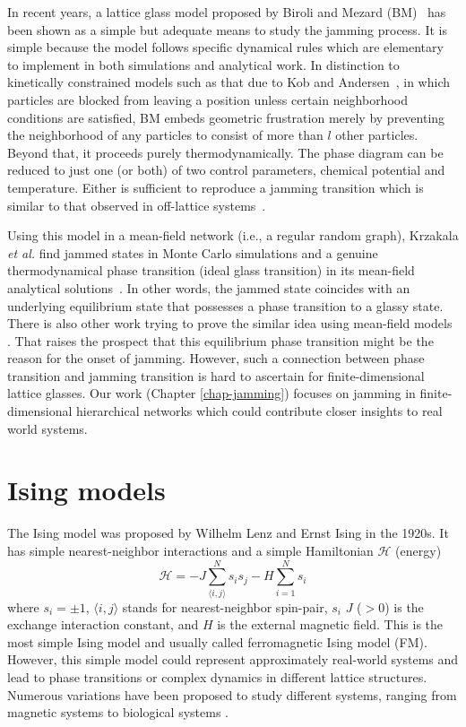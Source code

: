 In recent years, a lattice glass model proposed by Biroli and Mezard
(BM)~\cite{Biroli02} has been shown as a simple but adequate means
to study the jamming process. It is simple because the model follows
specific dynamical rules which are elementary to implement in both
simulations and analytical work. In distinction to kinetically constrained
models such as that due to Kob and Andersen~\cite{Kob93}, in which
particles are blocked from leaving a position unless certain neighborhood
conditions are satisfied, BM embeds geometric frustration merely by
preventing the neighborhood of any particles to consist of more than
$l$ other particles. Beyond that, it proceeds purely thermodynamically.
The phase diagram can be reduced to just one (or both) of two control
parameters, chemical potential and temperature. Either is sufficient
to reproduce a jamming transition which is similar to that observed
in off-lattice systems~\cite{Biroli02}. 

Using this model in a mean-field network 
(i.e., a regular random graph), Krzakala \textit{et al.} find
jammed states in Monte Carlo simulations and a genuine thermodynamical
phase transition (ideal glass transition) in its mean-field analytical
solutions~\cite{Krzakala2008}. In other words, the jammed state coincides
with an underlying equilibrium state that possesses a phase transition
to a glassy state. There is also other work trying to prove the similar idea using mean-field models \cite{Rivoire03,berthier2011theory, Parisi2010}. That raises the prospect that this equilibrium phase transition might be the reason for the onset of jamming. However, such a connection between phase transition and jamming transition is hard to ascertain for finite-dimensional lattice glasses. Our work (Chapter \ref{chap-jamming}) focuses on jamming in finite-dimensional hierarchical networks which could contribute closer insights to real world systems.



\section{Ising models}
The Ising model was proposed by Wilhelm Lenz and Ernst Ising \cite{ising1925contribution, brush1967history} in the 1920s. It has simple nearest-neighbor interactions and a simple Hamiltonian $\mathcal{H}$ (energy)
\begin{equation}
\mathcal{H}=-J \sum_{\langle i, j\rangle}^N s_i s_j - H \sum_{i=1}^N s_i
\label{eq:intro-ising}
\end{equation}
where $s_i=\pm1$, $\langle i, j\rangle$ stands for nearest-neighbor spin-pair, $s_i$ $J$ ($>0$) is the exchange interaction constant, and $H$ is the external magnetic field. This is the most simple Ising model and usually called ferromagnetic Ising model (FM).
However, this simple model could represent approximately real-world systems and lead to phase transitions \cite{onsager1944} or complex dynamics \cite{Fredrickson1984} in different lattice structures. 
Numerous variations have been proposed to study different systems, ranging from magnetic systems \cite{blundell2001magnetism} to biological systems \cite{hopfield1982neural}.

